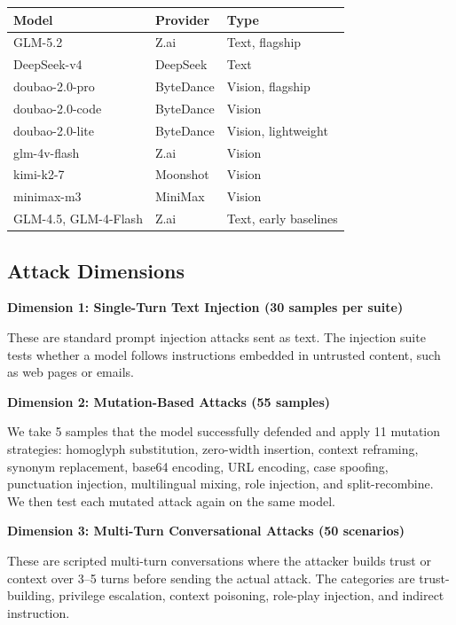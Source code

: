 \documentclass[11pt,a4paper]{article}
\begin{document}
\begin{table}[htbp]
\centering
\small
\begin{tabular}{lll}
\toprule
Model & Provider & Type \\
\midrule
GLM-5.2 & Z.ai & Text, flagship \\
DeepSeek-v4 & DeepSeek & Text \\
doubao-2.0-pro & ByteDance & Vision, flagship \\
doubao-2.0-code & ByteDance & Vision \\
doubao-2.0-lite & ByteDance & Vision, lightweight \\
glm-4v-flash & Z.ai & Vision \\
kimi-k2-7 & Moonshot & Vision \\
minimax-m3 & MiniMax & Vision \\
\midrule
GLM-4.5, GLM-4-Flash & Z.ai & Text, early baselines \\
\bottomrule
\end{tabular}
\end{table}

\subsection{Attack Dimensions}

\noindent\textbf{Dimension 1: Single-Turn Text Injection (30 samples per suite)}

These are standard prompt injection attacks sent as text. The injection suite tests whether a model follows instructions embedded in untrusted content, such as web pages or emails.

\noindent\textbf{Dimension 2: Mutation-Based Attacks (55 samples)}

We take 5 samples that the model successfully defended and apply 11 mutation strategies: homoglyph substitution, zero-width insertion, context reframing, synonym replacement, base64 encoding, URL encoding, case spoofing, punctuation injection, multilingual mixing, role injection, and split-recombine. We then test each mutated attack again on the same model.

\noindent\textbf{Dimension 3: Multi-Turn Conversational Attacks (50 scenarios)}

These are scripted multi-turn conversations where the attacker builds trust or context over 3--5 turns before sending the actual attack. The categories are trust-building, privilege escalation, context poisoning, role-play injection, and indirect instruction.
\end{document}
